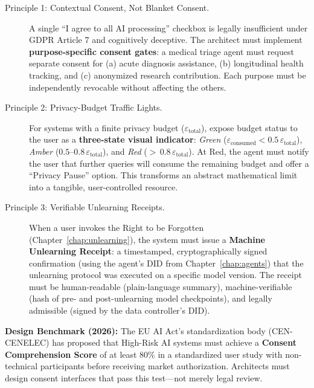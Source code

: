 \begin{description}
  \item[Principle 1: Contextual Consent, Not Blanket Consent.]
    A single ``I agree to all AI processing'' checkbox is legally insufficient under GDPR Article 7 and cognitively deceptive. The architect must implement \textbf{purpose-specific consent gates}: a medical triage agent must request separate consent for (a) acute diagnosis assistance, (b) longitudinal health tracking, and (c) anonymized research contribution. Each purpose must be independently revocable without affecting the others.

  \item[Principle 2: Privacy-Budget Traffic Lights.]
    For systems with a finite privacy budget ($\varepsilon_{\text{total}}$), expose budget status to the user as a \textbf{three-state visual indicator}: \textit{Green} ($\varepsilon_{\text{consumed}} < 0.5\,\varepsilon_{\text{total}}$), \textit{Amber} ($0.5$--$0.8\,\varepsilon_{\text{total}}$), and \textit{Red} (${>}\,0.8\,\varepsilon_{\text{total}}$). At Red, the agent must notify the user that further queries will consume the remaining budget and offer a ``Privacy Pause'' option. This transforms an abstract mathematical limit into a tangible, user-controlled resource.

  \item[Principle 3: Verifiable Unlearning Receipts.]
    When a user invokes the Right to be Forgotten (Chapter~\ref{chap:unlearning}), the system must issue a \textbf{Machine Unlearning Receipt}: a timestamped, cryptographically signed confirmation (using the agent's DID from Chapter~\ref{chap:agents}) that the unlearning protocol was executed on a specific model version. The receipt must be human-readable (plain-language summary), machine-verifiable (hash of pre- and post-unlearning model checkpoints), and legally admissible (signed by the data controller's DID).
\end{description}

\begin{svgraybox}
\textbf{Design Benchmark (2026):} The EU AI Act's standardization body (CEN-CENELEC) has proposed that High-Risk AI systems must achieve a \textbf{Consent Comprehension Score} of at least 80\% in a standardized user study with non-technical participants before receiving market authorization. Architects must design consent interfaces that pass this test---not merely legal review.
\end{svgraybox}

